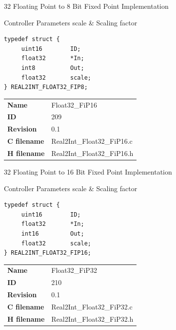 32 Floating Point to 8 Bit Fixed Point Implementation

\begin{XtoCtabular}{Controller Parameters}
scale & Scaling factor\tabularnewline
\hline
\end{XtoCtabular}

\begin{lstlisting}
typedef struct {
     uint16        ID;
     float32       *In;
     int8          Out;
     float32       scale;
} REAL2INT_FLOAT32_FIP8;
\end{lstlisting}

\ifdefined \AddTestReports
{}
\fi
{}
\nopagebreak[0]
\begin{tabular}{l l}
\textbf{Name} & Float32\_FiP16 \tabularnewline
\textbf{ID} & 209 \tabularnewline
\textbf{Revision} & 0.1 \tabularnewline
\textbf{C filename} & Real2Int\_Float32\_FiP16.c \tabularnewline
\textbf{H filename} & Real2Int\_Float32\_FiP16.h \tabularnewline
\end{tabular}
\vspace{1ex}

32 Floating Point to 16 Bit Fixed Point Implementation

\begin{XtoCtabular}{Controller Parameters}
scale & Scaling factor\tabularnewline
\hline
\end{XtoCtabular}

\begin{lstlisting}
typedef struct {
     uint16        ID;
     float32       *In;
     int16         Out;
     float32       scale;
} REAL2INT_FLOAT32_FIP16;
\end{lstlisting}

\ifdefined \AddTestReports
{}
\fi
{}
\nopagebreak[0]
\begin{tabular}{l l}
\textbf{Name} & Float32\_FiP32 \tabularnewline
\textbf{ID} & 210 \tabularnewline
\textbf{Revision} & 0.1 \tabularnewline
\textbf{C filename} & Real2Int\_Float32\_FiP32.c \tabularnewline
\textbf{H filename} & Real2Int\_Float32\_FiP32.h \tabularnewline
\end{tabular}
\vspace{1ex}

